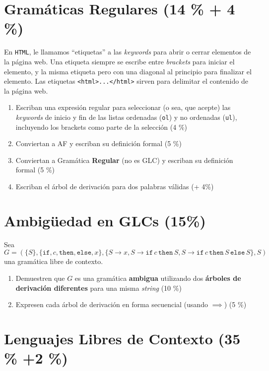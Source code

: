 \documentclass[8pt, onside]{article}
\begin{document}
\section{Gramáticas Regulares (14 \% + 4 \%)}

En \texttt{HTML}, le llamamos ``etiquetas'' a las \textit{keywords} para abrir o cerrar elementos de la página web.
Una etiqueta siempre se escribe entre \textit{brackets} para iniciar el elemento, y la misma etiqueta pero con una diagonal al principio para finalizar el elemento.
Las etiquetas \verb|<html>...</html>| sirven para delimitar el contenido de la página web.

\begin{enumerate}[label=\tt \alph*)]
    \itemsep0em
    \item Escriban una expresión regular para seleccionar (o sea, que acepte) las \textit{keywords} de inicio y fin de las listas ordenadas (\texttt{ol}) y no ordenadas (\texttt{ul}), incluyendo los brackets como parte de la selección (4 \%)
    \item Conviertan a AF y escriban su definición formal (5 \%)
    \item Conviertan a Gramática \textbf{Regular} (no es GLC) y escriban su definición formal (5 \%)
    \item Escriban el árbol de derivación para dos palabras válidas (+ 4\%)
\end{enumerate}


\section{Ambigüedad en GLCs (15\%)}

Sea $G=(\{S\},\{\mathtt{if}, c, \mathtt{then}, \mathtt{else}, x\}, \{S \to x, S \to \mathtt{if} \, c \, \mathtt{then} \, S, S \to \mathtt{if} \, c \, \mathtt{then} \, S \, \mathtt{else} \, S\}, S)$ una gramática libre de contexto.

\begin{enumerate}[label=\tt \alph*)]
    \item Demuestren que $G$ es una gramática \textbf{ambigua} utilizando dos \textbf{árboles de derivación diferentes} para una misma \textit{string} (10 \%)
    \item Expresen cada árbol de derivación en forma secuencial (usando $\implies$) (5 \%)
\end{enumerate}


\section{Lenguajes Libres de Contexto (35 \% +2 \%)}
\end{document}
